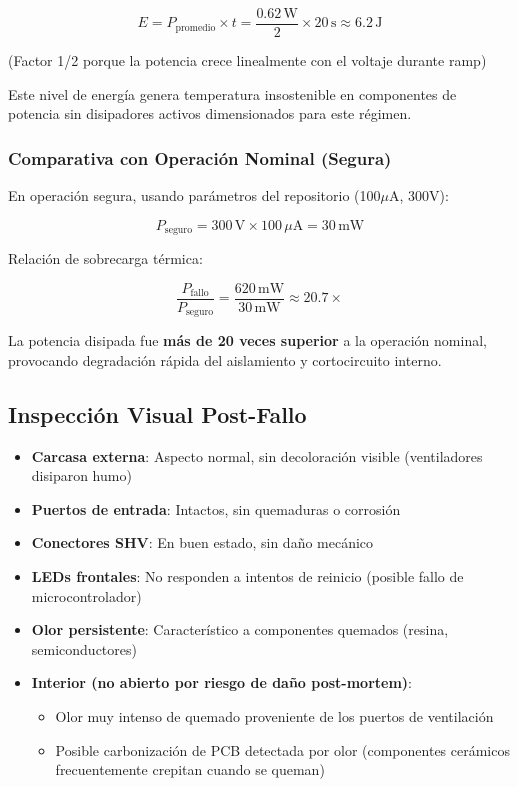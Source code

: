 \documentclass{article}
\begin{document}
\[
E = P_{\text{promedio}} \times t = \frac{0.62\,\text{W}}{2} \times 20\,\text{s} \approx 6.2\,\text{J}
\]

(Factor 1/2 porque la potencia crece linealmente con el voltaje durante ramp)

Este nivel de energía genera temperatura insostenible en componentes de potencia sin disipadores activos dimensionados para este régimen.

\subsubsection{Comparativa con Operación Nominal (Segura)}

En operación segura, usando parámetros del repositorio (100\(\mu\)A, 300V):

\[
P_{\text{seguro}} = 300\,\text{V} \times 100\,\mu\text{A} = 30\,\text{mW}
\]

Relación de sobrecarga térmica:

\[
\frac{P_{\text{fallo}}}{P_{\text{seguro}}} = \frac{620\,\text{mW}}{30\,\text{mW}} \approx 20.7\times
\]

La potencia disipada fue \textbf{más de 20 veces superior} a la operación nominal, provocando degradación rápida del aislamiento y cortocircuito interno.

\subsection{Inspección Visual Post-Fallo}

\begin{itemize}
    \item \textbf{Carcasa externa}: Aspecto normal, sin decoloración visible (ventiladores disiparon humo)
    \item \textbf{Puertos de entrada}: Intactos, sin quemaduras o corrosión
    \item \textbf{Conectores SHV}: En buen estado, sin daño mecánico
    \item \textbf{LEDs frontales}: No responden a intentos de reinicio (posible fallo de microcontrolador)
    \item \textbf{Olor persistente}: Característico a componentes quemados (resina, semiconductores)
    \item \textbf{Interior (no abierto por riesgo de daño post-mortem)}: 
    \begin{itemize}
        \item Olor muy intenso de quemado proveniente de los puertos de ventilación
        \item Posible carbonización de PCB detectada por olor (componentes cerámicos frecuentemente crepitan cuando se queman)
    \end{itemize}
\end{itemize}
\end{document}
